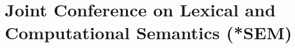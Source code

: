 \chapter{Joint Conference on Lexical and Computational Semantics (*SEM)}
\thispagestyle{emptyheader}

\cleardoublepage

\clearpage

